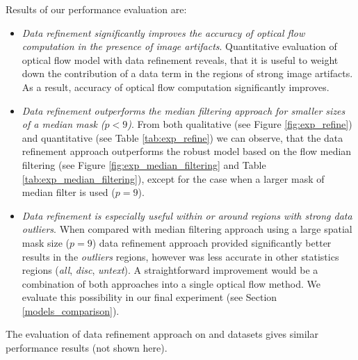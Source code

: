 Results of our performance evaluation are:
\begin{itemize}
	\item \textit{Data refinement significantly improves the accuracy of optical flow computation in the presence of image artifacts}. Quantitative evaluation of optical flow model with data refinement reveals, that it is useful to weight down the contribution of a data term in the regions of strong image artifacts. As a result, accuracy of optical flow computation significantly improves.
	
	\item \textit{Data refinement outperforms the median filtering approach for smaller sizes of a median mask ($p < 9$)}. From both qualitative (see Figure \ref{fig:exp_refine}) and quantitative (see Table \ref{tab:exp_refine}) we can observe, that the data refinement approach outperforms the robust model based on the flow median filtering (see Figure \ref{fig:exp_median_filtering} and Table \ref{tab:exp_median_filtering}), except for the case when a larger mask of median filter is used ($p = 9$).
	
	\item \textit{Data refinement is especially useful within or around regions with strong data outliers}. When compared with median filtering approach using a large spatial mask size ($p = 9$) data refinement approach provided significantly better results in the \textit{outliers} regions, however was less accurate in other statistics regions (\textit{all}, \textit{disc}, \textit{untext}). A straightforward improvement would be a combination of both approaches into a single optical flow method. We evaluate this possibility in our final experiment (see Section \ref{models_comparison}).    
\end{itemize}

The evaluation of data refinement approach on \hyd and \mar datasets gives similar performance results (not shown here). 






